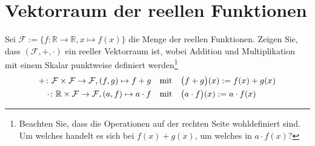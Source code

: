 \documentclass[11pt]{scrartcl}
\begin{document}
\section{Vektorraum der reellen Funktionen}
Sei $\mathcal{F} := \{f:\mathbb{R}\to \mathbb{R}, x\mapsto f(x)\}$ die Menge der reellen Funktionen. Zeigen Sie, dass $(\mathcal{F}, +, \cdot)$ ein reeller Vektorraum ist, wobei Addition und Multiplikation mit einem Skalar punktweise definiert werden\footnote{%
  Beachten Sie, dass die Operationen auf der rechten Seite wohldefiniert sind. 
  Um welches \quotes{$+$} handelt es sich bei $f(x) + g(x)$, um welches \quotes{$\cdot$} in $a \cdot f(x)$?
}
\begin{align*}
  +\colon  \mathcal{F} \times \mathcal{F} \to  \mathcal{F}, (f, g) \mapsto f+g & \quad\mbox{mit}\quad \bigl(f+g\bigr) (x) := f(x) + g(x)\\
  \cdot\colon  \mathbb{R} \times \mathcal{F} \to  \mathcal{F}, (a, f) \mapsto a \cdot f & \quad\mbox{mit}\quad \bigl(a \cdot f\bigr) (x) := a \cdot f(x)
\end{align*}
\end{document}
